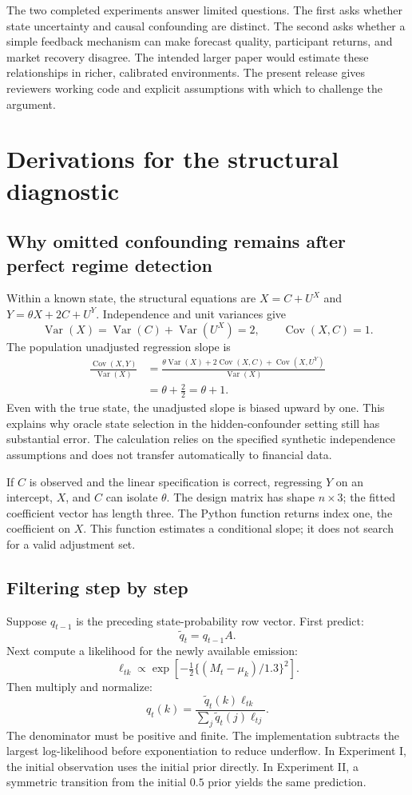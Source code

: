 The two completed experiments answer limited questions. The first asks whether state uncertainty and causal confounding are distinct. The second asks whether a simple feedback mechanism can make forecast quality, participant returns, and market recovery disagree. The intended larger paper would estimate these relationships in richer, calibrated environments. The present release gives reviewers working code and explicit assumptions with which to challenge the argument.

\section{Derivations for the structural diagnostic}
\subsection{Why omitted confounding remains after perfect regime detection}
Within a known state, the structural equations are $X=C+U^X$ and $Y=\theta X+2C+U^Y$. Independence and unit variances give
\[
\operatorname{Var}(X)=\operatorname{Var}(C)+\operatorname{Var}(U^X)=2,\qquad
\operatorname{Cov}(X,C)=1.
\]
The population unadjusted regression slope is
\begin{align*}
\frac{\operatorname{Cov}(X,Y)}{\operatorname{Var}(X)}
&=\frac{\theta\operatorname{Var}(X)+2\operatorname{Cov}(X,C)
+\operatorname{Cov}(X,U^Y)}{\operatorname{Var}(X)}\\
&=\theta+\frac{2}{2}=\theta+1.
\end{align*}
Even with the true state, the unadjusted slope is biased upward by one. This explains why oracle state selection in the hidden-confounder setting still has substantial error. The calculation relies on the specified synthetic independence assumptions and does not transfer automatically to financial data.

If $C$ is observed and the linear specification is correct, regressing $Y$ on an intercept, $X$, and $C$ can isolate $\theta$. The design matrix has shape $n\times3$; the fitted coefficient vector has length three. The Python function  returns index one, the coefficient on $X$. This function estimates a conditional slope; it does not search for a valid adjustment set.

\subsection{Filtering step by step}
Suppose $q_{t-1}$ is the preceding state-probability row vector. First predict:
\[
\widetilde q_t=q_{t-1}A.
\]
Next compute a likelihood for the newly available emission:
\[
\ell_{tk}\propto\exp\left[-\tfrac12\{(M_t-\mu_k)/1.3\}^2\right].
\]
Then multiply and normalize:
\[
q_t(k)=\frac{\widetilde q_t(k)\ell_{tk}}
{\sum_j\widetilde q_t(j)\ell_{tj}}.
\]
The denominator must be positive and finite. The implementation subtracts the largest log-likelihood before exponentiation to reduce underflow. In Experiment I, the initial observation uses the initial prior directly. In Experiment II, a symmetric transition from the initial $0.5$ prior yields the same prediction.

